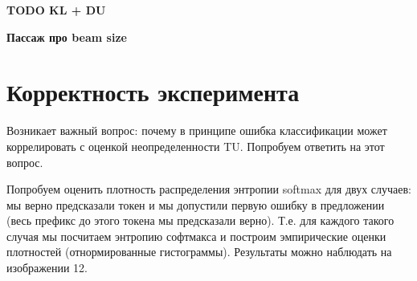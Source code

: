 \documentclass[a4paper,14pt]{extarticle}
\begin{document}
	\textbf{TODO KL + DU}
	
	\textbf{Пассаж про beam size}

	\begin{figure}[t]
	\end{figure}
	
\section{Корректность эксперимента}
	Возникает важный вопрос: почему в принципе ошибка классификации может коррелировать с оценкой неопределенности TU. Попробуем ответить на этот вопрос.
	
	\begin{figure}[t]
	\end{figure}
	
	Попробуем оценить плотность распределения энтропии softmax для двух случаев: мы верно предсказали токен и мы допустили первую ошибку в предложении (весь префикс до этого токена мы предсказали верно). Т.е. для каждого такого случая мы посчитаем энтропию софтмакса и построим эмпирические оценки плотностей (отнормированные гистограммы). Результаты можно наблюдать на изображении 12.
	
\end{document}
